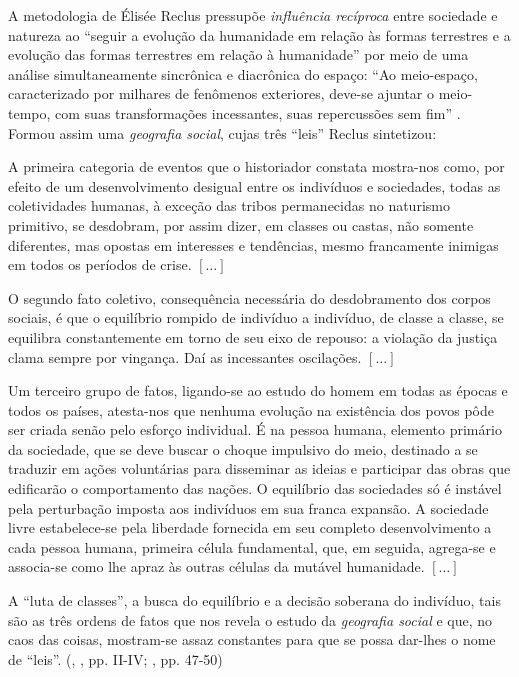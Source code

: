 A metodologia de Élisée Reclus pressupõe \textit{influência recíproca} entre sociedade e natureza ao ``seguir a evolução da humanidade em relação às formas terrestres e a evolução das formas terrestres em relação à humanidade'' \cite[pp.~78-79]{reclus_renovacao_2010} por meio de uma análise simultaneamente sincrônica e diacrônica do espaço: ``Ao meio-espaço, caracterizado por milhares de fenômenos exteriores, deve-se ajuntar o meio-tempo, com suas transformações incessantes, suas repercussões sem fim'' \cite[p.~110]{RECLUS1905a}. Formou assim uma \textit{geografia social}, cujas três ``leis'' Reclus sintetizou:

\begin{citacao}
A primeira categoria de eventos que o historiador constata mostra-nos como, por efeito de um desenvolvimento desigual entre os indivíduos e sociedades, todas as coletividades humanas, à exceção das tribos permanecidas no naturismo primitivo, se desdobram, por assim dizer, em classes ou castas, não somente diferentes, mas opostas em interesses e tendências, mesmo francamente inimigas em todos os períodos de crise. \([\dots]\)

O segundo fato coletivo, consequência necessária do desdobramento dos corpos sociais, é que o equilíbrio rompido de indivíduo a indivíduo, de classe a classe, se equilibra constantemente em torno de seu eixo de repouso: a violação da justiça clama sempre por vingança. Daí as incessantes oscilações. \([\dots]\)

Um terceiro grupo de fatos, ligando-se ao estudo do homem em todas as épocas e todos os países, atesta-nos que nenhuma evolução na existência dos povos pôde ser criada senão pelo esforço individual. É na pessoa humana, elemento primário da sociedade, que se deve buscar o choque impulsivo do meio, destinado a se traduzir em ações voluntárias para disseminar as ideias e participar das obras que edificarão o comportamento das nações. O equilíbrio das sociedades só é instável pela perturbação imposta aos indivíduos em sua franca expansão. A sociedade livre estabelece-se pela liberdade fornecida em seu completo desenvolvimento a cada pessoa humana, primeira célula fundamental, que, em seguida, agrega-se e associa-se como lhe apraz às outras células da mutável humanidade. \([\dots]\)

A ``luta de classes'', a busca do equilíbrio e a decisão soberana do indivíduo, tais são as três ordens de fatos que nos revela o estudo da \textit{geografia social} e que, no caos das coisas, mostram-se assaz constantes para que se possa dar-lhes o nome de ``leis''. (\citeauthor{RECLUS1905a}, \citeyear{RECLUS1905a}, pp. II-IV; \citeyear{reclus_renovacao_2010}, pp. 47-50)
\end{citacao}

